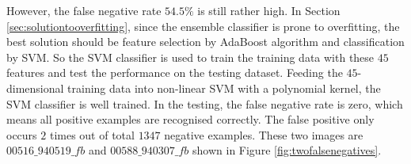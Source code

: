 However, the false negative rate $54.5\%$ is still rather high. In \mbox{Section} \ref{sec:solutiontooverfitting}, since the ensemble classifier is prone to overfitting, the best solution should be feature selection by AdaBoost algorithm and classification by SVM. So the SVM classifier is used to train the training data with these $45$ features and test the performance on the testing dataset. Feeding the $45$-dimensional training data into non-linear SVM with a polynomial kernel, the SVM classifier is well trained. In the testing, the false negative rate is zero, which means all positive examples are recognised correctly. The false positive only occurs $2$ times out of total $1347$ negative examples. These two images are $00516\_940519\_fb$ and $00588\_940307\_fb$ shown in \mbox{Figure} \ref{fig:twofalsenegatives}.
\begin{figure}[ht]
 \begin{center}

\end{center}
\end{figure}
